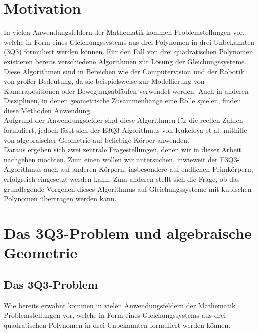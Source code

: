 \documentclass[a4paper,oneside, 11pt, openany%
]{article}
\theoremstyle{custom}
\theoremstyle{custom}
\begin{document}
	\pagestyle{fancy}
	\section{Motivation}\label{chp:Motivation}
	In vielen Anwendungsfeldern der Mathematik kommen Problemstellungen vor, welche in Form eines Gleichungssystems aus drei Polynomen in drei Unbekannten (3Q3) formuliert werden können. Für den Fall von drei quadratischen Polynomen existieren bereits verschiedene Algorithmen zur Lösung der Gleichungssysteme. Diese Algorithmen sind in Bereichen wie der Computervision und der Robotik von großer Bedeutung, da sie beispielsweise zur Modellierung von Kamerapositionen oder Bewegungsabläufen verwendet werden. Auch in anderen Disziplinen, in denen geometrische Zusammenhänge eine Rolle spielen, finden diese Methoden Anwendung.\\
	
	Aufgrund der Anwendungsfelder sind diese Algorithmen für die reellen Zahlen formuliert, jedoch lässt sich der E3Q3-Algorithmus von Kukelova et al. \cite{kukelova2016efficient} mithilfe von algebraischer Geometrie auf beliebige Körper anwenden.\\
	
	Daraus ergeben sich zwei zentrale Fragestellungen, denen wir in dieser Arbeit nachgehen möchten. Zum einen wollen wir untersuchen, inwieweit der E3Q3-Algorithmus auch auf anderen Körpern, insbesondere auf endlichen Primkörpern, erfolgreich eingesetzt werden kann. Zum anderen stellt sich die Frage, ob das grundlegende Vorgehen dieses Algorithmus auf Gleichungssysteme mit kubischen Polynomen übertragen werden kann.
	\newpage
	\section{Das 3Q3-Problem und algebraische Geometrie}
	\subsection{Das 3Q3-Problem}
	Wie bereits erwähnt kommen in vielen Anwendungsfeldern der Mathematik Problemstellungen vor, welche in Form eines Gleichungssystems aus drei quadratischen Polynomen in drei Unbekannten formuliert werden können.
	
\end{document}
